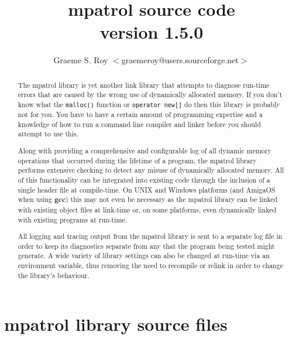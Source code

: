 \documentclass[a4paper,final]{report}
\newcommand{\version}[0]{1.5.0}
\begin{document}
\title{\textbf{mpatrol source code} \\ version \version}

\author{Graeme S. Roy $<$graemeroy@users.sourceforge.net$>$}

\maketitle

\begin{abstract}
The mpatrol library is yet another link library that attempts to diagnose
run-time errors that are caused by the wrong use of dynamically allocated
memory.  If you don't know what the \texttt{malloc()} function or
\texttt{operator new[]} do then this library is probably not for you.  You
have to have a certain amount of programming expertise and a knowledge of
how to run a command line compiler and linker before you should attempt to
use this.

Along with providing a comprehensive and configurable log of all dynamic
memory operations that occurred during the lifetime of a program, the
mpatrol library performs extensive checking to detect any misuse of
dynamically allocated memory.  All of this functionality can be integrated
into existing code through the inclusion of a single header file at
compile-time.  On UNIX and Windows platforms (and AmigaOS when using
\textbf{gcc}) this may not even be necessary as the mpatrol library can be
linked with existing object files at link-time or, on some platforms, even
dynamically linked with existing programs at run-time.

All logging and tracing output from the mpatrol library is sent to a
separate log file in order to keep its diagnostics separate from any that
the program being tested might generate.  A wide variety of library settings
can also be changed at run-time via an environment variable, thus removing
the need to recompile or relink in order to change the library's behaviour.
\end{abstract}


\tableofcontents

\chapter{mpatrol library source files}


\pagestyle{myheadings}
\end{document}
